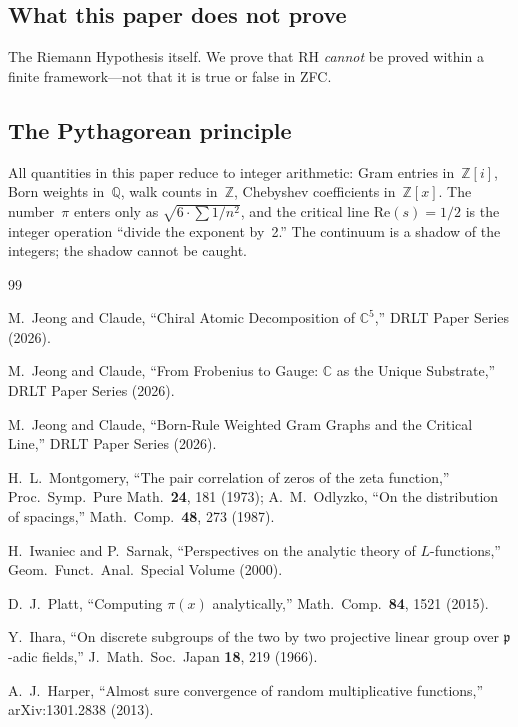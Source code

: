\documentclass[12pt]{article}
\theoremstyle{definition}
\theoremstyle{remark}
\newcommand{\CC}{\mathbb{C}}
\newcommand{\ZZ}{\mathbb{Z}}
\newcommand{\QQ}{\mathbb{Q}}
\begin{document}
\subsection{What this paper does not prove}

The Riemann Hypothesis itself. We prove that RH \emph{cannot}
be proved within a finite framework---not that it is true or
false in ZFC.

\subsection{The Pythagorean principle}

All quantities in this paper reduce to integer arithmetic:
Gram entries in~$\ZZ[i]$, Born weights in~$\QQ$, walk counts
in~$\ZZ$, Chebyshev coefficients in~$\ZZ[x]$.
The number~$\pi$ enters only as $\sqrt{6 \cdot \sum 1/n^2}$,
and the critical line $\mathrm{Re}(s) = 1/2$ is the integer
operation ``divide the exponent by~2.''
The continuum is a shadow of the integers; the shadow cannot
be caught.

\begin{thebibliography}{99}

M.~Jeong and Claude,
``Chiral Atomic Decomposition of $\CC^5$,''
DRLT Paper Series (2026).

M.~Jeong and Claude,
``From Frobenius to Gauge: $\CC$ as the Unique Substrate,''
DRLT Paper Series (2026).

M.~Jeong and Claude,
``Born-Rule Weighted Gram Graphs and the Critical Line,''
DRLT Paper Series (2026).

H.~L.~Montgomery,
``The pair correlation of zeros of the zeta function,''
Proc.\ Symp.\ Pure Math.\ \textbf{24}, 181 (1973);
A.~M.~Odlyzko, ``On the distribution of spacings,''
Math.\ Comp.\ \textbf{48}, 273 (1987).

H.~Iwaniec and P.~Sarnak,
``Perspectives on the analytic theory of $L$-functions,''
Geom.\ Funct.\ Anal.\ Special Volume (2000).

D.~J.~Platt,
``Computing $\pi(x)$ analytically,''
Math.\ Comp.\ \textbf{84}, 1521 (2015).

Y.~Ihara,
``On discrete subgroups of the two by two projective linear
group over $\mathfrak{p}$-adic fields,''
J.\ Math.\ Soc.\ Japan \textbf{18}, 219 (1966).

A.~J.~Harper,
``Almost sure convergence of random multiplicative functions,''
arXiv:1301.2838 (2013).

\end{thebibliography}
\end{document}
